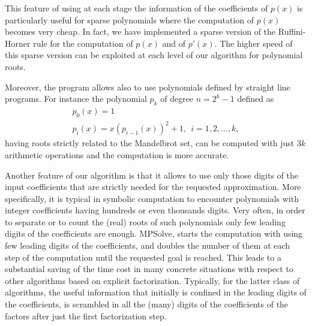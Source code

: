 \documentclass{article}
\begin{document}
This feature of using at each stage the information of the
coefficients of $p(x)$ is particularly useful for sparse polynomials
where the computation of $p(x)$ becomes very cheap.  In fact, we have
implemented a sparse version of the Ruffini-Horner rule for the
computation of $p(x)$ and of $p'(x)$. The higher speed of this sparse
version can be exploited at each level of our algorithm for polynomial
roots.

Moreover, the program allows also to use polynomials defined by
straight line programs. For instance the polynomial $p_k$ of degree
$n=2^k-1$ defined as
\begin{equation}\label{mandel}
\begin{array}{l}
p_0(x)=1 \\
p_{i}(x)=x(p_{i-1}(x))^2+1, \ \ i=1,2,\ldots, k,
\end{array}
\end{equation}
having roots strictly related to the Mandelbrot set, can be computed
with just $3k$ arithmetic operations and the computation is more
accurate.

Another feature of our algorithm is that it allows to use only those
digits of the input coefficients that are strictly needed for the
requested approximation. More specifically, it is typical in symbolic
computation to encounter polynomials with integer coefficients having
hundreds or even thousands digits. Very often, in order to separate or
to count the (real) roots of such polynomials only few leading digits
of the coefficients are enough.  MPSolve, starts the computation
with using few leading digits of the coefficients, and doubles the
number of them at each step of the computation until the requested
goal is reached.  This leads to a substantial saving of the time cost
in many concrete situations with respect to other algorithms based on
explicit factorization. Typically, for the latter class of algorithms,
the useful information that initially is
confined in the leading digits of the coefficients, is scrambled
 in all the (many) digits of the coefficients of the factors  after
just the first factorization step.
\end{document}
